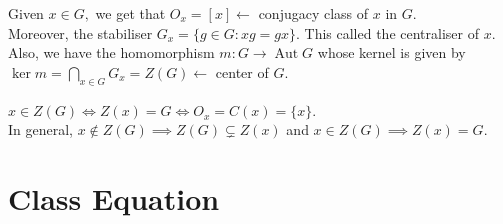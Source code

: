 \documentclass[12 pt, a4paper, toc=graduated, oneside]{article}
\theoremstyle{definition}
\newcommand{\Aut}{\operatorname{Aut}}
\begin{document}
Given $x \in G,$ we get that $O_x = [x] \longleftarrow$ conjugacy class of $x$ in $G.$\\
Moreover, the stabiliser $G_x = \{g \in G : xg = gx\}.$ This called the centraliser of $x.$\\
Also, we have the homomorphism $m : G \to \Aut G$ whose kernel is given by $\ker m = \displaystyle\bigcap_{x \in G}G_x = Z(G) \longleftarrow$ center of $G.$\\~\\
$x \in Z(G) \iff Z(x) = G \iff O_x = C(x) = \{x\}.$\\
In general, $x \notin Z(G) \implies Z(G) \subsetneq Z(x)$ and $x \in Z(G) \implies Z(x) = G.$

\section{Class Equation}
\end{document}
